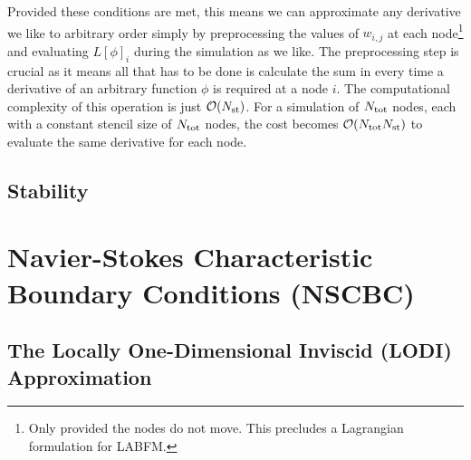 Provided these conditions are met, this means we can approximate any derivative we like to arbitrary order simply by preprocessing the values of $w_{i, j}$ at each node\footnote{Only provided the nodes do not move. This precludes a Lagrangian formulation for LABFM.} and evaluating $L[\phi]_i$ during the simulation as we like. The preprocessing step is crucial as it means all that has to be done is calculate the sum in  every time a derivative of an arbitrary function $\phi$ is required at a node $i$. The computational complexity of this operation is just $\cl{O}(N_{\rm{st}})$. For a simulation of $N_{\rm{tot}}$ nodes, each with a constant stencil size of $N_{\rm{tot}}$ nodes, the cost becomes $\cl{O}(N_{\rm{tot}} N_{\rm{st}})$ to evaluate the same derivative for each node.





\subsection{Stability}










\section{Navier-Stokes Characteristic Boundary Conditions (NSCBC)}




\subsection{The Locally One-Dimensional Inviscid (LODI) Approximation}


